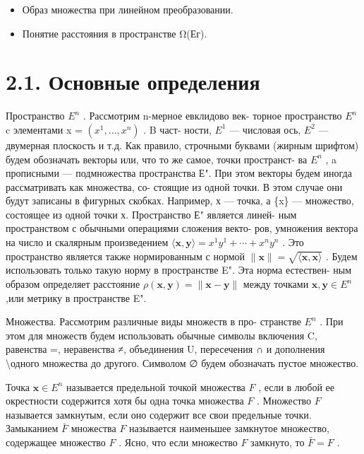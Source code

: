 \documentclass[8pt]{extarticle}
\begin{document}
\begin{itemize}\relax
\item\relax Образ множества при линейном преобразовании.
\end{itemize}

\begin{itemize}\relax
\item\relax Понятие расстояния в пространстве Ω(Ег).
\end{itemize}

\section*{2.1. Основные определения}

Пространство \({E}^{n}\) . Рассмотрим n-мерное евклидово век- торное пространство \({E}^{n}\) c элементами x = \(\left( {{x}^{1},\ldots ,{x}^{n}}\right)\) . B част- ности, \({E}^{1}\) — числовая ось, \({E}^{2}\) — двумерная плоскость и т.д. Как правило, строчными буквами (жирным шрифтом) будем обозначать векторы или, что то же самое, точки пространст- ва \({E}^{n}\) , a прописными — подмножества пространства Е". При этом векторы будем иногда рассматривать как множества, со- стоящие из одной точки. В этом случае они будут записаны в фигурных скобках. Например, х — точка, а \{x\} — множество, состоящее из одной точки х. Пространство Е" является линей- ным пространством с обычными операциями сложения векто- ров, умножения вектора на число и скалярным произведением \(\langle \mathbf{x},\mathbf{y}\rangle  = {x}^{1}{y}^{1} + \cdots  + {x}^{n}{y}^{n}\) . Это пространство является также нормированным с нормой \(\parallel \mathbf{x}\parallel  = \sqrt{\langle \mathbf{x},\mathbf{x}\rangle }\) . Будем использовать только такую норму в пространстве E". Эта норма естествен- ным образом определяет расстояние \(\rho \left( {\mathbf{x},\mathbf{y}}\right)  = \parallel \mathbf{x} - \mathbf{y}\parallel\) между точками \(\mathbf{x},\mathbf{y} \in  {E}^{n}\) ,или метрику в пространстве E".

Множества. Рассмотрим различные виды множеств в про- странстве \({E}^{n}\) . При этом для множеств будем использовать обычные символы включения C, равенства =, неравенства ≠, объединения U, пересечения ∩ и дополнения  \textbackslash  одного множества до другого. Символом ∅ будем обозначать пустое множество.

Точка \(\mathbf{x} \in  {E}^{n}\) называется предельной точкой множества \(F\) , если в любой ее окрестности содержится хотя бы одна точка множества \(F\) . Множество \(F\) называется замкнутым, если оно содержит все свои предельные точки. Замыканием \(\bar{F}\) множества \(F\) называется наименьшее замкнутое множество, содержащее множество \(F\) . Ясно, что если множество \(F\) замкнуто, то \(\bar{F} = F\) .
\end{document}
